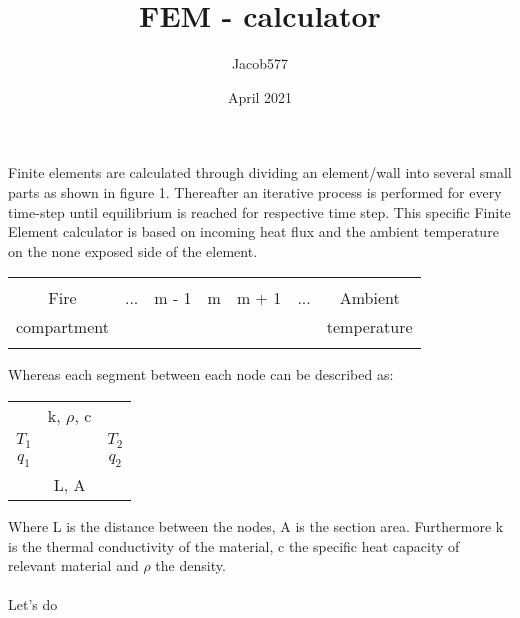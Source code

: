 \documentclass{article}
\title{FEM - calculator}
\author{Jacob577}
\date{April 2021}
\begin{document}
\maketitle

\clearpage


\newpage

Finite elements are calculated through dividing an element/wall into several small parts as shown in figure 1. Thereafter an iterative process is performed for every time-step until equilibrium is reached for respective time step. This specific Finite Element calculator is based on incoming heat flux and the ambient temperature on the none exposed side of the element. 
\begin{center}
\begin{tabular}{ c|c|c|c|c|c|c } 
 \hline
 {} & {} & {} & {} & {} & {} \\ 
 Fire & ... & m - 1 & m & m + 1 & ... & Ambient \\ 
 compartment & {} & {} & {} & {} & {} & temperature \\ 
 {} & {} & {} & {} & {} & {} \\
 \hline
\end{tabular}
\end{center}

Whereas each segment between each node can be described as:
\begin{center}
\begin{tabular}{ c|c|c } 
 \hline
 {} & k, $\rho$, c & {} \\ 
 $T_1$ & ${}$ & $T_2$  \\ 
 $q_1$ & ${}$ & $q_2$   \\ 
 ${}$ & L, A & ${}$  \\
 \hline
\end{tabular}
\end{center}
Where L is the distance between the nodes, A is the section area. Furthermore k is the thermal conductivity of the material, c the specific heat capacity of relevant material and $\rho$ the density. 
\\ \\
Let's do 
\end{document}
